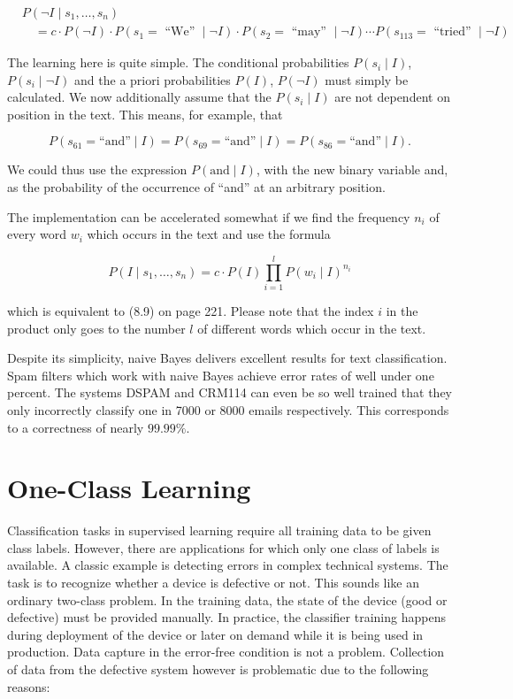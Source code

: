 \documentclass[10pt]{book}
\begin{document}
$$
\begin{aligned}
& P\left(\neg I \mid s_{1}, \ldots, s_{n}\right) \\
& \quad=c \cdot P(\neg I) \cdot P\left(s_{1}=\text { ``We'' } \mid \neg I\right) \cdot P\left(s_{2}=\text { ``may'' } \mid \neg I\right) \cdots P\left(s_{113}=\text { ``tried'' } \mid \neg I\right)
\end{aligned}
$$

The learning here is quite simple. The conditional probabilities $P\left(s_{i} \mid I\right)$, $P\left(s_{i} \mid \neg I\right)$ and the a priori probabilities $P(I)$, $P(\neg I)$ must simply be calculated. We now additionally assume that the $P\left(s_{i} \mid I\right)$ are not dependent on position in the text. This means, for example, that

$$
P\left(s_{61}=\text{``and''} \mid I\right)=P\left(s_{69}=\text{``and''} \mid I\right)=P\left(s_{86}=\text{``and''} \mid I\right) .
$$

We could thus use the expression $P(\text{and}\mid I)$, with the new binary variable and, as the probability of the occurrence of ``and'' at an arbitrary position.

The implementation can be accelerated somewhat if we find the frequency $n_{i}$ of every word $w_{i}$ which occurs in the text and use the formula

\begin{equation*}
P\left(I \mid s_{1}, \ldots, s_{n}\right)=c \cdot P(I) \prod_{i=1}^{l} P\left(w_{i} \mid I\right)^{n_{i}} \tag{8.10}
\end{equation*}

which is equivalent to (8.9) on page 221. Please note that the index $i$ in the product only goes to the number $l$ of different words which occur in the text.

Despite its simplicity, naive Bayes delivers excellent results for text classification. Spam filters which work with naive Bayes achieve error rates of well under one percent. The systems DSPAM and CRM114 can even be so well trained that they only incorrectly classify one in 7000 or 8000 emails respectively. This corresponds to a correctness of nearly $99.99 \%$.

\section{One-Class Learning}
Classification tasks in supervised learning require all training data to be given class labels. However, there are applications for which only one class of labels is available. A classic example is detecting errors in complex technical systems. The task is to recognize whether a device is defective or not. This sounds like an ordinary two-class problem. In the training data, the state of the device (good or defective) must be provided manually. In practice, the classifier training happens during deployment of the device or later on demand while it is being used in production. Data capture in the error-free condition is not a problem. Collection of data from the defective system however is problematic due to the following reasons:
\end{document}
